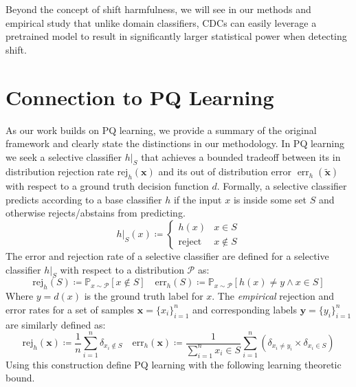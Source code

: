 Beyond the concept of shift harmfulness, we will see in our methods and empirical study that unlike domain classifiers, CDCs can easily leverage a pretrained model to result in significantly larger statistical power when detecting shift.


\section{Connection to PQ Learning}\label{sec:relationship-with-pq-learning}

As our work builds on PQ learning, we provide a summary of the original framework and clearly state the distinctions in our methodology.
In PQ learning we seek a selective classifier $\left. h\right|_{S}$ that achieves
a bounded tradeoff between its in distribution rejection rate $\text{rej}_h(\mathbf{x})$ and its out of distribution error $\operatorname{err}_h(\tilde{\mathbf{x}})$ with respect to a ground truth decision function $d$.
Formally, a selective classifier predicts according to a base classifier $h$ if the input $x$ is inside some set $S$ and otherwise rejects/abstains from predicting.
\begin{equation}
    \left. h\right|_{S}(x) \coloneqq \begin{cases}
                                         h(x) & x\in S \\
                                         \text{reject} & x\not\in S
    \end{cases}
    \label{eq:selective_classifier_defn}
\end{equation}
The error and rejection rate of a selective classifier are defined for a selective classifier $\left. h\right|_{S}$ with respect to a distribution $\mathcal{P}$ as:
\begin{equation}
    \text{rej}_{h}(S) \coloneqq \mathbb{P}_{x\sim\mathcal{P}}\left[x\not \in S\right]\quad \text{err}_h(S) \coloneqq \mathbb{P}_{x\sim\mathcal{P}}\left[h(x) \neq y\land x\in S\right]
\end{equation}
Where $y=d(x)$ is the ground truth label for $x$.
The \textit{empirical} rejection and error rates for a set of samples $\mathbf{x}=\{x_i\}_{i=1}^n$ and corresponding labels $\mathbf{y}=\{y_i\}_{i=1}^n$ are similarly defined as:
\begin{equation}
    \text{rej}_{h}(\mathbf{x}) \coloneqq \frac{1}{n}\sum_{i=1}^n \delta_{x_i\not \in S}\quad \text{err}_h(\mathbf{x}) \coloneqq \frac{1}{\sum_{i=1}^n x_i\in S} \sum_{i=1}^n \left(\delta_{x_i\neq y_i} \times \delta_{x_i\in S}\right)
\end{equation}
\noindent
Using this construction \citeauthor{pqlearn} define PQ learning with the following learning theoretic bound.

